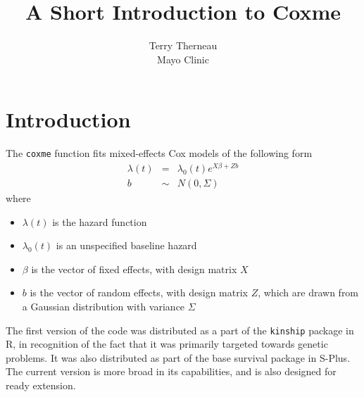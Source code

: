 \documentclass{article}
\title{A Short Introduction to Coxme}
\author{Terry Therneau \\
        Mayo Clinic}
\begin{document}
\maketitle

\section{Introduction}
 The \texttt{coxme} function fits mixed-effects Cox models of the following
form
\begin{eqnarray}
  \lambda(t) &=& \lambda_0(t) e^{X\beta + Z b} \label{eq1} \\
  b &\sim & N(0, \Sigma) \nonumber
\end{eqnarray}
where \begin{itemize}
  \item $\lambda(t)$ is the hazard function
  \item $\lambda_0(t)$ is an unspecified baseline hazard
  \item $\beta$ is the vector of fixed effects, with design matrix $X$
  \item $b$ is the vector of random effects, with design matrix $Z$,
    which are drawn from a Gaussian distribution with variance $\Sigma$
\end{itemize}

The first version of the code was distributed as a part of the \texttt{kinship}
package in R, in recognition of the fact that it was primarily targeted
towards genetic problems.  It was also distributed as part of the base
survival package in S-Plus.  The current version is more broad in its
capabilities, and is also designed for ready extension.
\end{document}
